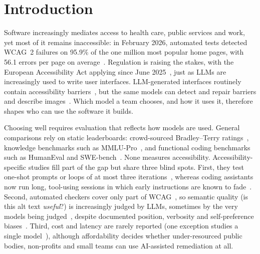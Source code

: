 \documentclass[10pt,conference]{IEEEtran}
\begin{document}
\section{Introduction}

Software increasingly mediates access to health care, public services and work, yet most of it remains inaccessible: in February 2026, automated tests detected WCAG~2 failures on 95.9\% of the one million most popular home pages, with 56.1 errors per page on average~\cite{webaim2026}. Regulation is raising the stakes, with the European Accessibility Act applying since June 2025~\cite{eaa2019}, just as LLMs are increasingly used to write user interfaces. LLM-generated interfaces routinely contain accessibility barriers~\cite{aljedaani2024chatgpt,gurita2025perpetuates,rabelo2025mobile,kreer2026webaccessbench}, but the same models can detect and repair barriers and describe images~\cite{fathallah2025accessguru,oyelayo2026repair,mohanbabu2024context}. Which model a team chooses, and how it uses it, therefore shapes who can use the software it builds.

Choosing well requires evaluation that reflects how models are used. General comparisons rely on static leaderboards: crowd-sourced Bradley--Terry ratings~\cite{chiang2024arena}, knowledge benchmarks such as MMLU-Pro~\cite{wang2024mmlupro}, and functional coding benchmarks such as HumanEval and SWE-bench~\cite{chen2021humaneval,jimenez2024swebench}. None measures accessibility. Accessibility-specific studies fill part of the gap but share three blind spots. First, they test one-shot prompts or loops of at most three iterations~\cite{suh2025human,oyelayo2026repair}, whereas coding assistants now run long, tool-using sessions in which early instructions are known to fade~\cite{laban2025lost,liu2024lost}. Second, automated checkers cover only part of WCAG~\cite{vigo2013benchmarking}, so semantic quality (is this alt text \emph{useful}?) is increasingly judged by LLMs, sometimes by the very models being judged~\cite{calo2026semantic}, despite documented position, verbosity and self-preference biases~\cite{zheng2023judging,wang2024fair,panickssery2024self}. Third, cost and latency are rarely reported (one exception studies a single model~\cite{oyelayo2026repair}), although affordability decides whether under-resourced public bodies, non-profits and small teams can use AI-assisted remediation at all.
\end{document}
